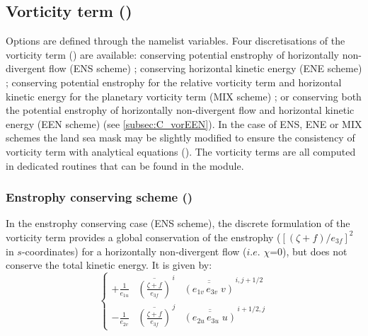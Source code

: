 \documentclass[../tex_main/NEMO_manual]{subfiles}
\begin{document}
\subsection{Vorticity term (\protect{})}
\label{subsec:DYN_vor}

Options are defined through the  namelist variables.
Four discretisations of the vorticity term () are available: 
conserving potential enstrophy of horizontally non-divergent flow (ENS scheme) ; 
conserving horizontal kinetic energy (ENE scheme) ; conserving potential enstrophy for 
the relative vorticity term and horizontal kinetic energy for the planetary vorticity 
term (MIX scheme) ; or conserving both the potential enstrophy of horizontally non-divergent 
flow and horizontal kinetic energy (EEN scheme) (see \autoref{subsec:C_vorEEN}). In the 
case of ENS, ENE or MIX schemes the land sea mask may be slightly modified to ensure the 
consistency of vorticity term with analytical equations ().
The vorticity terms are all computed in dedicated routines that can be found in 
the  module.

\subsubsection{Enstrophy conserving scheme (\protect{})}
\label{subsec:DYN_vor_ens}

In the enstrophy conserving case (ENS scheme), the discrete formulation of the 
vorticity term provides a global conservation of the enstrophy 
($ [ (\zeta +f ) / e_{3f} ]^2 $ in $s$-coordinates) for a horizontally non-divergent 
flow ($i.e.$ $\chi$=$0$), but does not conserve the total kinetic energy. It is given by:
\begin{equation} \label{eq:dynvor_ens}
\left\{ 
\begin{aligned}
{+\frac{1}{e_{1u} } } & {\overline {\left( { \frac{\zeta +f}{e_{3f} }} \right)} }^{\,i} 
                                & {\overline{\overline {\left( {e_{1v}\,e_{3v}\;v} \right)}} }^{\,i, j+1/2}    \\
{- \frac{1}{e_{2v} } } & {\overline {\left( {\frac{\zeta +f}{e_{3f} }} \right)} }^{\,j}  
                                & {\overline{\overline {\left( {e_{2u}\,e_{3u}\;u} \right)}} }^{\,i+1/2, j}  
\end{aligned} 
 \right.
\end{equation} 
\end{document}

